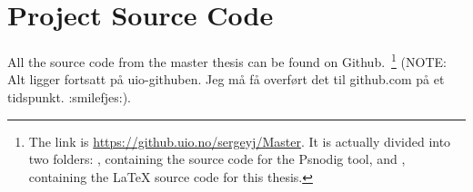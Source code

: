 \section{Project Source Code}

All the source code from the master thesis can be found on Github.~\footnote{The link is \url{https://github.uio.no/sergeyj/Master}. It is actually divided into two folders: , containing the source code for the Psnodig tool, and , containing the LaTeX source code for this thesis.} (NOTE: Alt ligger fortsatt på uio-githuben. Jeg må få overført det til github.com på et tidspunkt. :smilefjes:).